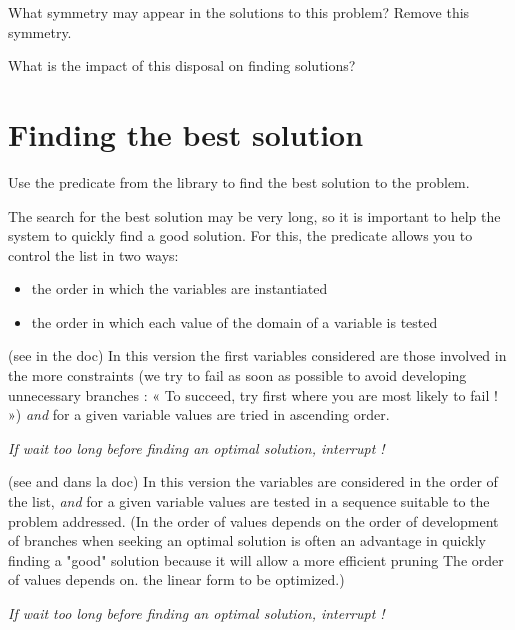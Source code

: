\begin{question}\label{Qsym}
What symmetry may appear in the solutions to this problem? Remove this symmetry.

What is the impact of this disposal on finding solutions?
\end{question}

\section{Finding the best solution}

\begin{question}
 Use the predicate  from the library  to find the best solution to the problem.
\end{question}

The search for the best solution may be very long, so it is important to help the system to quickly find a good solution. For this, the predicate  allows you to control the list in two ways:
\begin{itemize}
 \item the order in which the variables are instantiated
 \item the order in which each value of the domain of a variable is tested
\end{itemize}


\begin{version}\label{v1} (see  in the doc)
In this version the first variables considered are those involved in the more constraints (we try to fail as soon as possible to avoid developing unnecessary branches
: « To succeed, try first where you are most likely to fail ! »)
\emph{and} for a given variable values are tried in ascending order.

\emph{If wait too long before finding an optimal solution, interrupt !}
\end{version}


\begin{version}\label{v2} (see  and  dans la doc)
In this version the variables are considered in the order of the list, \emph{and} for a given variable values are tested in a sequence suitable to the problem addressed. (In the order of values depends on the order of development of branches when seeking an optimal solution is often an advantage in quickly finding a "good" solution because it will allow a more efficient pruning The order of values depends on. the linear form to be optimized.)

\emph{If wait too long before finding an optimal solution, interrupt !}
\end{version}

